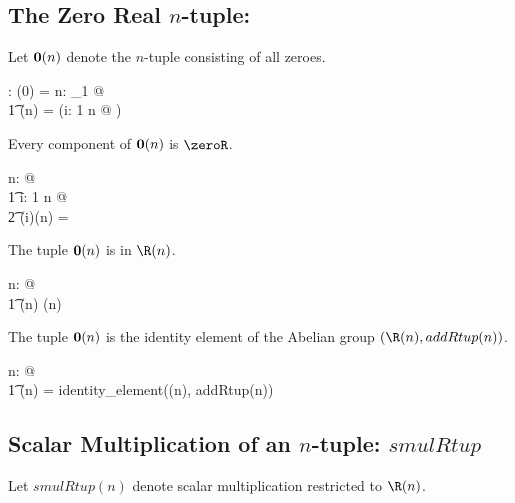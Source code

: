 \documentclass{amsart}
\begin{document}
\subsection{The Zero Real $n$-tuple: }

Let $\operatorname{\mathbf{0}}(n)$ denote the $n$-tuple consisting of all zeroes.

\begin{axdef}
	\zeroRtup: \nat \fun \Rinf
\where
	\zeroRtup(0) = \langle \rangle
\also
	\forall n: \nat_1 @ \\
	\t1	\zeroRtup(n) = (\lambda i: 1 \upto n @ \zeroR)
\end{axdef}

\begin{remark}
Every component of $\operatorname{\mathbf{0}}(n)$ is $\zeroR$.

\begin{zed}
\forall n: \nat @ \\
\t1	\forall i: 1 \upto n @ \\
\t2	(\piRinf i)(\zeroRtup n) = \zeroR
\end{zed}

\end{remark}

\begin{remark}
The tuple $\operatorname{\mathbf{0}}(n)$ is in $\Rtup(n)$.

\begin{zed}
\forall n: \nat @ \\
\t1	\zeroRtup(n) \in \Rtup(n)
\end{zed}

\end{remark}

\begin{remark}
The tuple $\operatorname{\mathbf{0}}(n)$ is the identity element of the Abelian group $(\Rtup(n), addRtup(n))$.

\begin{zed}
\forall n: \nat @ \\
\t1	\zeroRtup(n) = identity\_element(\Rtup(n), addRtup(n))
\end{zed}

\end{remark}

\subsection{Scalar Multiplication of an $n$-tuple: $smulRtup$}

Let $smulRtup(n)$ denote scalar multiplication restricted to $\Rtup(n)$.
\end{document}
